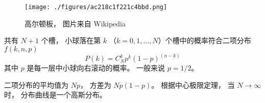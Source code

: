 
\begin{issues}
\issueDraft
\end{issues}


\begin{figure}[ht]
\centering
\texttt{[image: ./figures/ac218c1f221c4bbd.png]}
\caption{高尔顿板， 图片来自 Wikipedia} \label{fig_Galton_1}
\end{figure}

共有 $N+1$ 个槽， 小球落在第 $k$ （$k = 0,1,\dots,N$）个槽中的概率符合二项分布 $f(k,n,p)$
\begin{equation}
P(k) = C_N^k p^k (1-p)^{(n-k)}
\end{equation}
其中 $p$ 是每一层中小球向右滚动的概率。 一般来说 $p = 1/2$。

二项分布的平均值为 $Np$， 方差为 $Np(1-p)$。 根据中心极限定理， 当 $N\to\infty$ 时， 分布曲线是一个高斯分布。
